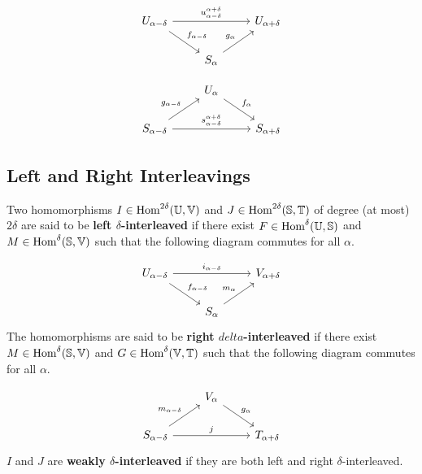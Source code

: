 \begin{minipage}{0.45\textwidth}
\begin{equation}\label{dgm:interleaving1}
  \begin{tikzcd}
    U_{\alpha-\delta}\arrow{rr}{u_{\alpha-\delta}^{\alpha+\delta}}\arrow{dr}{f_{\alpha-\delta}} & &
    U_{\alpha+\delta}\\
    & S_{\alpha}\arrow{ur}{g_\alpha} &
\end{tikzcd}\end{equation}
\end{minipage}
\begin{minipage}{0.45\textwidth}
\begin{equation}\label{dgm:interleaving2}
  \begin{tikzcd}
    & U_{\alpha}\arrow{dr}{f_\alpha} &\\
    S_{\alpha-\delta}\arrow{rr}{s_{\alpha-\delta}^{\alpha+\delta}}\arrow{ur}{g_{\alpha-\delta}} & &
    S_{\alpha+\delta}
\end{tikzcd}\end{equation}
\end{minipage}

\subsection{Left and Right Interleavings}

Two homomorphisms $I\in\mathrm{Hom}^{2\delta}(\mathbb{U},\mathbb{V})$ and $J\in\mathrm{Hom}^{2\delta}(\mathbb{S},\mathbb{T})$ of degree (at most) $2\delta$ are said to be \textbf{left $\delta$-interleaved} if there exist $F\in\mathrm{Hom}^\delta(\mathbb{U},\mathbb{S})$ and $M\in\mathrm{Hom}^\delta(\mathbb{S},\mathbb{V})$ such that the following diagram commutes for all $\alpha$.

\begin{equation}\label{dgm:left_interleaving}
  \begin{tikzcd}
    U_{\alpha-\delta}\arrow{rr}{i_{\alpha-\delta}}\arrow{dr}{f_{\alpha-\delta}} & &
    V_{\alpha+\delta}\\
    & S_{\alpha}\arrow{ur}{m_\alpha} &
\end{tikzcd}\end{equation}
The homomorphisms are said to be \textbf{right $delta$-interleaved} if there exist $M\in\mathrm{Hom}^\delta(\mathbb{S},\mathbb{V})$ and $G\in\mathrm{Hom}^\delta(\mathbb{V},\mathbb{T})$ such that the following diagram commutes for all $\alpha$.

\begin{equation}\label{dgm:right_interleaving}
  \begin{tikzcd}
    & V_{\alpha}\arrow{dr}{g_\alpha} &\\
    S_{\alpha-\delta}\arrow{rr}{j}\arrow{ur}{m_{\alpha-\delta}} & &
    T_{\alpha+\delta}
\end{tikzcd}\end{equation}
$I$ and $J$ are \textbf{weakly $\delta$-interleaved} if they are both left and right $\delta$-interleaved.


